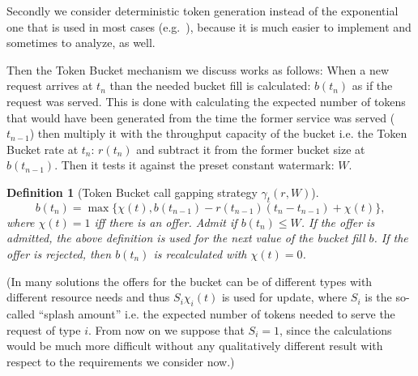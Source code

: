 \documentclass[conference]{IEEEtran}
\newtheorem{definition}{Definition}
\begin{document}
Secondly we consider deterministic token generation instead of the
exponential one that is used in most cases (e.g.~\cite{H.248.11}),
because it is much easier to implement and sometimes to analyze, as
well.

Then the Token Bucket mechanism we discuss works as follows: When a
new request arrives at $t_n$ than the needed bucket fill is
calculated: $b(t_n)$ as if the request was served. This is done with
calculating the expected number of tokens that would have been
generated from the time the former service was served ($t_{n-1}$)
then multiply it with the throughput capacity of the bucket i.e. the
Token Bucket rate at $t_n$: $r(t_n)$ and subtract it from the former
bucket size at $b(t_{n-1})$. Then it tests it against the preset
constant watermark: $W$.
\begin{definition}[Token Bucket call gapping strategy
$\gamma_t(r,W)$]
\begin{equation}\label{eq-bucketfill-basic}
b(t_n)=\max\{\chi(t), b(t_{n-1})-r(t_{n-1})(t_n-t_{n-1})+\chi(t)\},
\end{equation}
where $\chi(t)=1$ iff there is an offer. Admit if $b(t_n)\leq W$. If
the offer is admitted, the above definition is used for the next
value of the bucket fill $b$. If the offer is rejected, then
$b(t_n)$ is recalculated with $\chi(t)=0$.
\end{definition}

(In many solutions the offers for the bucket can be of different
types with different resource needs and thus $S_i \chi_i(t)$ is used
for update, where $S_i$ is the so-called ``splash amount'' i.e. the
expected number of tokens needed to serve the request of type $i$.
From now on we suppose that $S_i=1$, since the calculations would be
much more difficult without any qualitatively different result with
respect to the requirements we consider now.)
\end{document}

